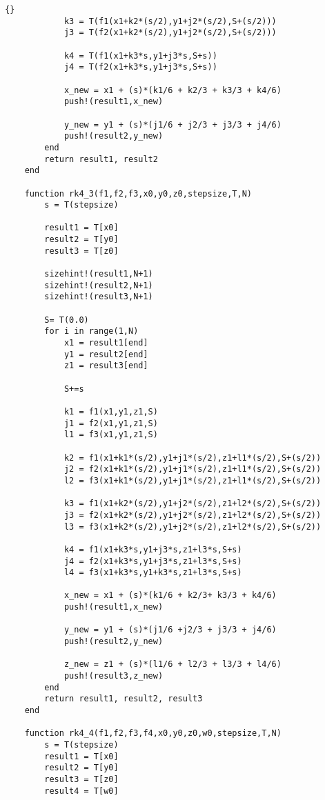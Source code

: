 \begin{lstlisting}[caption =\text{numerical\_scheme.jl}, label =code_numericalscheme]{}
            k3 = T(f1(x1+k2*(s/2),y1+j2*(s/2),S+(s/2)))
            j3 = T(f2(x1+k2*(s/2),y1+j2*(s/2),S+(s/2)))

            k4 = T(f1(x1+k3*s,y1+j3*s,S+s))
            j4 = T(f2(x1+k3*s,y1+j3*s,S+s))

            x_new = x1 + (s)*(k1/6 + k2/3 + k3/3 + k4/6)
            push!(result1,x_new)

            y_new = y1 + (s)*(j1/6 + j2/3 + j3/3 + j4/6)
            push!(result2,y_new)
        end
        return result1, result2
    end

    function rk4_3(f1,f2,f3,x0,y0,z0,stepsize,T,N)
        s = T(stepsize)

        result1 = T[x0]
        result2 = T[y0]
        result3 = T[z0]

        sizehint!(result1,N+1)
        sizehint!(result2,N+1)
        sizehint!(result3,N+1)

        S= T(0.0)
        for i in range(1,N)
            x1 = result1[end]
            y1 = result2[end]
            z1 = result3[end]

            S+=s

            k1 = f1(x1,y1,z1,S)
            j1 = f2(x1,y1,z1,S)
            l1 = f3(x1,y1,z1,S)

            k2 = f1(x1+k1*(s/2),y1+j1*(s/2),z1+l1*(s/2),S+(s/2))
            j2 = f2(x1+k1*(s/2),y1+j1*(s/2),z1+l1*(s/2),S+(s/2))
            l2 = f3(x1+k1*(s/2),y1+j1*(s/2),z1+l1*(s/2),S+(s/2))

            k3 = f1(x1+k2*(s/2),y1+j2*(s/2),z1+l2*(s/2),S+(s/2))
            j3 = f2(x1+k2*(s/2),y1+j2*(s/2),z1+l2*(s/2),S+(s/2))
            l3 = f3(x1+k2*(s/2),y1+j2*(s/2),z1+l2*(s/2),S+(s/2))

            k4 = f1(x1+k3*s,y1+j3*s,z1+l3*s,S+s)
            j4 = f2(x1+k3*s,y1+j3*s,z1+l3*s,S+s)
            l4 = f3(x1+k3*s,y1+k3*s,z1+l3*s,S+s)

            x_new = x1 + (s)*(k1/6 + k2/3+ k3/3 + k4/6)
            push!(result1,x_new)

            y_new = y1 + (s)*(j1/6 +j2/3 + j3/3 + j4/6)
            push!(result2,y_new)

            z_new = z1 + (s)*(l1/6 + l2/3 + l3/3 + l4/6)
            push!(result3,z_new)
        end
        return result1, result2, result3
    end

    function rk4_4(f1,f2,f3,f4,x0,y0,z0,w0,stepsize,T,N)
        s = T(stepsize)
        result1 = T[x0]       
        result2 = T[y0]
        result3 = T[z0]
        result4 = T[w0]


\end{lstlisting}
